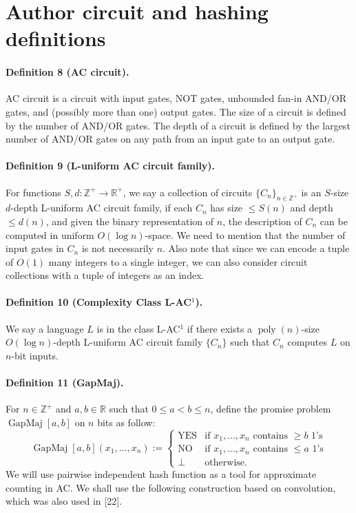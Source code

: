 \section*{Author circuit and hashing definitions}
\paragraph{Definition 8 (AC circuit).} AC circuit is a circuit with input gates, NOT gates, unbounded fan-in AND/OR gates, and (possibly more than one) output gates. The size of a circuit is defined by the number of AND/OR gates. The depth of a circuit is defined by the largest number of AND/OR gates on any path from an input gate to an output gate.
\paragraph{Definition 9 (L-uniform AC circuit family).} For functions $S,d:\mathbb Z^+\to\mathbb R^+$, we say a collection of circuits $\{C_n\}_{n\in\mathbb Z^+}$ is an $S$-size $d$-depth L-uniform AC circuit family, if each $C_n$ has size $\le S(n)$ and depth $\le d(n)$, and given the binary representation of $n$, the description of $C_n$ can be computed in uniform $O(\log n)$-space.
We need to mention that the number of input gates in $C_n$ is not necessarily $n$. Also note that since we can encode a tuple of $O(1)$ many integers to a single integer, we can also consider circuit collections with a tuple of integers as an index.
\paragraph{Definition 10 (Complexity Class L-AC$^1$).} We say a language $L$ is in the class L-AC$^1$ if there exists a $\operatorname{poly}(n)$-size $O(\log n)$-depth L-uniform AC circuit family $\{C_n\}$ such that $C_n$ computes $L$ on $n$-bit inputs.
\paragraph{Definition 11 (GapMaj).} For $n\in\mathbb Z^+$ and $a,b\in\mathbb R$ such that $0\le a<b\le n$, define the promise problem $\operatorname{GapMaj}[a,b]$ on $n$ bits as follow:
\[\operatorname{GapMaj}[a,b](x_1,\ldots,x_n):=\begin{cases}\mathrm{YES}&\text{if }x_1,\ldots,x_n\text{ contains }\ge b\text{ 1's}\\\mathrm{NO}&\text{if }x_1,\ldots,x_n\text{ contains }\le a\text{ 1's}\\\bot&\text{otherwise.}\end{cases}\]
We will use pairwise independent hash function as a tool for approximate counting in AC. We shall use the following construction based on convolution, which was also used in [22].
